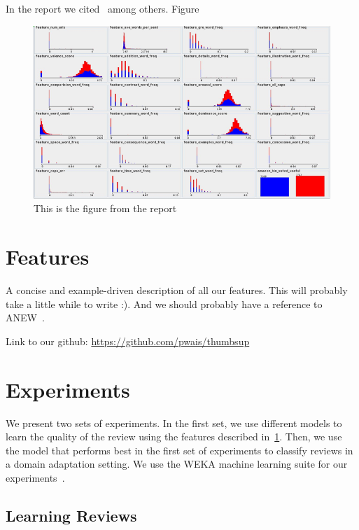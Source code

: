\documentclass[letterpaper]{article}
\begin{document}
In the report we cited~\cite{citeulike:352583} among others. Figure~

\begin{figure}[h]
  \centering
  \includegraphics[scale=.5]{features_distributions}
  \caption{This is the figure from the report}
  \label{fig:dist}
\end{figure}

\section{Features}
\label{sec:features}

A concise and example-driven description of all our features.  This
will probably take a little while to write :). And we should probably
have a reference to ANEW~\cite{DoddsANEWPaper}.

Link to our github:
\url{https://github.com/pwais/thumbsup}

\section{Experiments}
\label{sec:experiments}

We present two sets of experiments. In the first set, we use different
models to learn the quality of the review using the features described
in~\ref{sec:features}. Then, we use the model that performs best in
the first set of experiments to classify reviews in a domain
adaptation setting. We use the WEKA machine learning suite for our
experiments~\cite{weka}.

\subsection{Learning Reviews}
\label{sec:learning-reviews}
\end{document}

